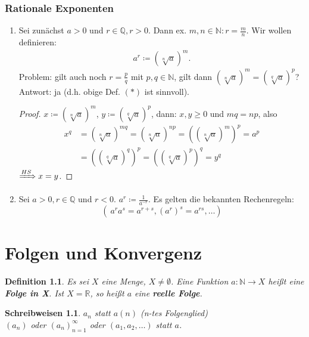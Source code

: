 \documentclass{extreport}
\newcommand{\N}{\mathbb{N}}
\newcommand{\Q}{\mathbb{Q}}
\newcommand{\R}{\mathbb{R}}
\theoremstyle{named}
\theoremstyle{dotless}
\newtheorem*{definition}{Definition}
\newtheorem*{schreibweisen}{Schreibweisen}
\begin{document}
\subsection*{Rationale Exponenten}
\begin{enumerate}
	\item Sei zunächst $a > 0$ und $r \in \Q, r > 0$. Dann ex. $m, n \in \N : r = \frac{m}{n}$. Wir wollen definieren:
		\begin{align}
			a^{r} \coloneqq \left( \sqrt[n]{a} \right)^{m} \tag{$*$}.			
		\end{align}
		Problem: gilt auch noch $r = \frac{p}{q}$ mit $p, q \in \N$, gilt dann $\left( \sqrt[n]{a} \right)^{m} = \left( \sqrt[q]{a} \right)^{p}$? \\
		Antwort: ja (d.h. obige Def. $(*)$ ist sinnvoll).
		\begin{proof}
			$x \coloneqq \left( \sqrt[n]{a} \right)^{m}$, $y \coloneqq \left( \sqrt[q]{a} \right)^{p}$, dann: $x, y \geq 0$ und $mq = np$, also
			\begin{align*}
				x^{q} & = \left( \sqrt[n]{a} \right)^{mq} = \left( \sqrt[n]{a} \right)^{np} = \left(  \left( \sqrt[n]{a} \right)^{m}\right)^{p} = a^{p} \\
					  & = \left( \left( \sqrt[q]{a} \right)^{q}\right)^{p} = \left( \left( \sqrt[q]{a} \right)^{p}\right)^{q} = y^{q}
			\end{align*}
			$\xRightarrow[]{HS} x = y$.  
		\end{proof}
	\item Sei $a > 0, r \in \Q$ und $r < 0$. $a^{r} \coloneqq \frac{1}{a^{-r}}$. Es gelten die bekannten Rechenregeln:
		$$
			\left( ~ a^{r} a^{s} = a^{r + s}, \left( a^{r} \right)^{s} = a^{rs}, \dotsc \right)
		$$
\end{enumerate}


\newpage


\chapter{Folgen und Konvergenz}

\begin{definition}
	Es sei $X$ eine Menge, $X \neq \emptyset$. Eine Funktion $a \colon \N \to X$ hei{\ss}t eine \textbf{Folge in X}. Ist $X = \R$, so hei{\ss}t $a$ eine \textbf{reelle Folge}.
\end{definition}


\begin{schreibweisen}
$a_{n}$ statt $a(n)$ (n-tes Folgenglied) \\
$(a_{n})$ oder $(a_{n})_{n = 1}^{\infty}$ oder $(a_{1}, a_{2}, \dotsc)$ statt $a$.
\end{schreibweisen}
\end{document}
